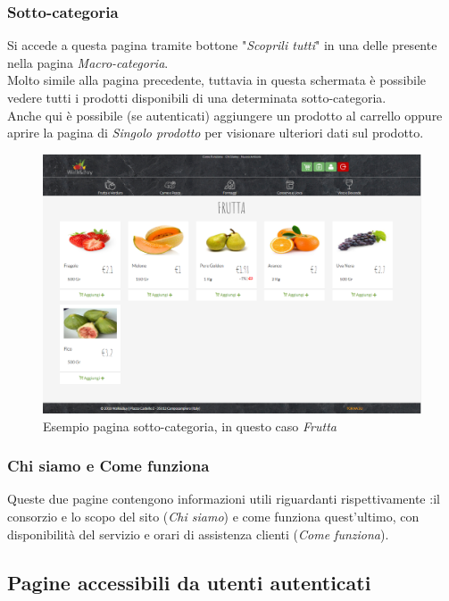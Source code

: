 	\subsubsection{Sotto-categoria}
	Si accede a questa pagina tramite bottone "\textit{Scoprili tutti}" in una delle  presente nella pagina \textit{Macro-categoria}.\\
	Molto simile alla pagina precedente, tuttavia in questa schermata è possibile vedere tutti i prodotti disponibili di una determinata sotto-categoria.\\
	Anche qui è possibile (se autenticati) aggiungere un prodotto al carrello oppure aprire la pagina di \textit{Singolo prodotto} per visionare ulteriori dati sul prodotto.
	\begin{figure}[H]
		\includegraphics[width=\linewidth]{res/img/sotto-cat}
		\caption{Esempio pagina sotto-categoria, in questo caso \textit{Frutta}}
		\label{Pagina Sotto-categoria}
	\end{figure}

	\subsubsection{Chi siamo e Come funziona}
	Queste due pagine contengono informazioni utili riguardanti rispettivamente :il consorzio e lo scopo del sito (\textit{Chi siamo}) e come funziona quest'ultimo, con disponibilità del servizio e orari di assistenza clienti (\textit{Come funziona}).
	 
\subsection{Pagine accessibili da utenti autenticati}
